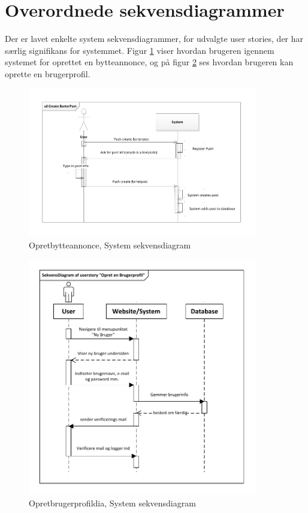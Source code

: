 \section{Overordnede sekvensdiagrammer}
Der er lavet enkelte system sekvensdiagrammer, for udvalgte user stories, der har særlig signifikans for systemmet. Figur \ref{fig:SDOpretBytteannoncedia} viser hvordan brugeren igennem systemet for oprettet en bytteannonce, og på figur \ref{fig:SDOpretBrugerprofildia} ses hvordan brugeren kan oprette en brugerprofil.



\begin{figure}[H]
	\includegraphics[trim = 6mm 6mm 6mm 6mm, clip, width=100mm]{figures/SDOpretBytteAnnonce.PDF}
	\caption{Opretbytteannonce, System sekvensdiagram }
	\label{fig:SDOpretBytteannoncedia}
	\end{figure}
	
	
	\begin{figure}[H]
	\includegraphics[trim = 6mm 6mm 6mm 6mm, clip, width=100mm]{figures/SekvensdiagramOpretBrugerprofil.PDF}
	\caption{Opretbrugerprofildia, System sekvensdiagram }
	\label{fig:SDOpretBrugerprofildia}
	\end{figure}